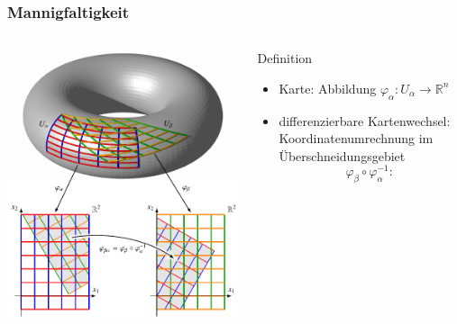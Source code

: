 %
%
%
\bgroup
\begin{frame}[t]
\setlength{\abovedisplayskip}{5pt}
\setlength{\belowdisplayskip}{5pt}
\frametitle{Mannigfaltigkeit}
\vspace{-20pt}
\begin{columns}[t,onlytextwidth]
\begin{column}{0.48\textwidth}
\begin{center}
\includegraphics[width=\textwidth]{../../buch/chapters/60-gruppen/images/karten.pdf}
\end{center}
\end{column}
\begin{column}{0.48\textwidth}
\begin{block}{Definition}
\begin{itemize}
\item<2-> Karte: Abbildung $\varphi_\alpha\colon U_\alpha\to\mathbb{R}^n$
\item<3-> differenzierbare Kartenwechsel: Koordinatenumrechnung im Überschneidungsgebiet
\[
\varphi_\beta\circ\varphi_\alpha^{-1}
\colon
\]
\end{itemize}
\end{block}
\end{column}
\end{columns}
\end{frame}
